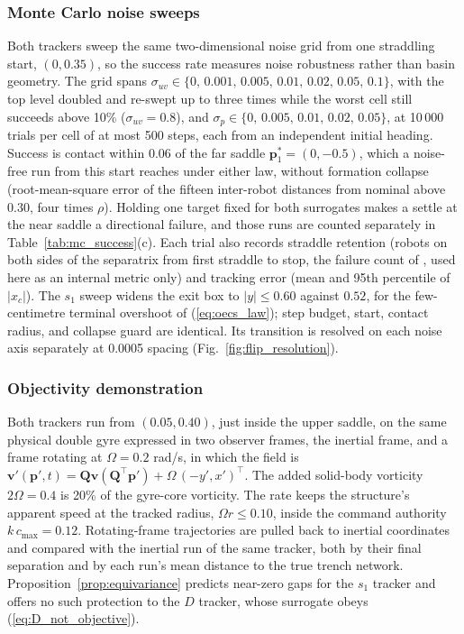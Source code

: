 \documentclass[lettersize,journal]{IEEEtran}
\begin{document}
\subsubsection{Monte Carlo noise sweeps}
Both trackers sweep the same two-dimensional noise grid from one
straddling start, $(0, 0.35)$, so the success rate measures noise
robustness rather than basin geometry. The grid spans $\sigma_{uv} \in
\{0,\, 0.001,\, 0.005,\, 0.01,\, 0.02,\, 0.05,\, 0.1\}$, with the top
level doubled and re-swept up to three times while the worst cell still
succeeds above 10\% ($\sigma_{uv} = 0.8$), and $\sigma_p \in \{0,\,
0.005,\, 0.01,\, 0.02,\, 0.05\}$, at 10\,000 trials per cell of at most
500 steps, each from an independent initial heading. Success is contact
within 0.06 of the far saddle $\mathbf{p}^*_1 = (0, -0.5)$, which a
noise-free run from this start reaches under either law, without
formation collapse (root-mean-square error of the fifteen inter-robot
distances from nominal above 0.30, four times $\rho$). Holding one
target fixed for both surrogates makes a settle at the near saddle a
directional failure, and those runs are counted separately in
Table~\ref{tab:mc_success}(c). Each trial also records straddle
retention (robots on both sides of the separatrix from first
straddle to stop, the failure count of \cite{17}, used here as an
internal metric only) and tracking error (mean and 95th percentile of
$|x_c|$). The $s_1$ sweep widens the exit box to
$|y| \leq 0.60$ against $0.52$, for the few-centimetre terminal
overshoot of (\ref{eq:oecs_law}); step budget, start, contact radius,
and collapse guard are identical. Its transition is resolved on each
noise axis separately at 0.0005 spacing
(Fig.~\ref{fig:flip_resolution}).

\subsubsection{Objectivity demonstration}
Both trackers run from $(0.05, 0.40)$, just inside the upper saddle, on
the same physical double gyre expressed in two
observer frames, the inertial frame, and a frame rotating at
$\Omega = 0.2$ rad/s, in which the field is
$\mathbf{v}'(\mathbf{p}', t) = \mathbf{Q}\mathbf{v}(\mathbf{Q}^\top
\mathbf{p}') + \Omega\,(-y', x')^\top$. The added solid-body vorticity
$2\Omega = 0.4$ is 20\% of the gyre-core vorticity. The rate keeps the
structure's apparent speed at the tracked radius, $\Omega r \leq 0.10$,
inside the command authority $k\,c_{\max} = 0.12$. Rotating-frame
trajectories are pulled back to inertial coordinates and compared with
the inertial run of the same tracker, both by their final separation and
by each run's mean distance to the true trench network.
Proposition~\ref{prop:equivariance} predicts near-zero gaps for the
$s_1$ tracker and offers no such protection to the $D$ tracker, whose
surrogate obeys (\ref{eq:D_not_objective}).
\end{document}
